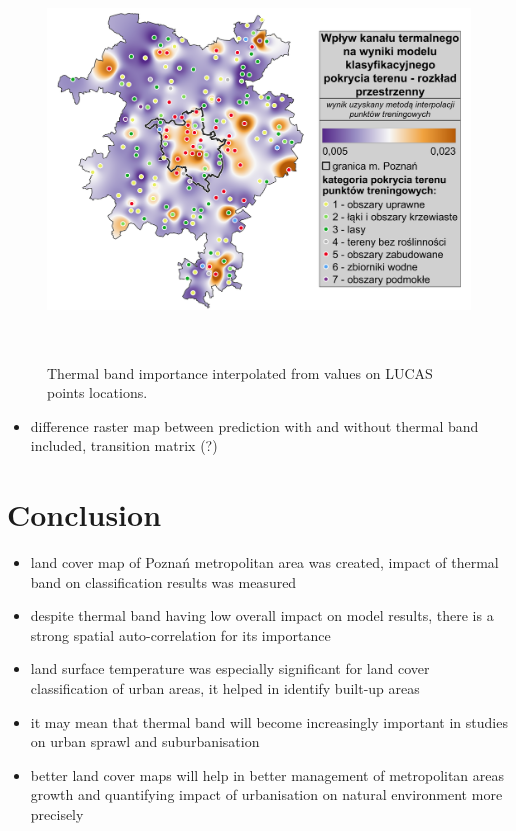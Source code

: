 \documentclass{amuthesis}
\begin{document}
\begin{figure}[t]

{\centering \includegraphics[width=5.875in,height=4.16667in]{./figures/B10_importance-spatial.png}

}

\caption{\label{fig-rycina18}Thermal band importance interpolated from
values on LUCAS points locations.}

\end{figure}

\begin{itemize}
\tightlist
\item
  difference raster map between prediction with and without thermal band
  included, transition matrix (?)
\end{itemize}


\hypertarget{conclusion}{%
\chapter{Conclusion}\label{conclusion}}

\begin{itemize}
\item
  land cover map of Poznań metropolitan area was created, impact of
  thermal band on classification results was measured
\item
  despite thermal band having low overall impact on model results, there
  is a strong spatial auto-correlation for its importance
\item
  land surface temperature was especially significant for land cover
  classification of urban areas, it helped in identify built-up areas
\item
  it may mean that thermal band will become increasingly important in
  studies on urban sprawl and suburbanisation
\item
  better land cover maps will help in better management of metropolitan
  areas growth and quantifying impact of urbanisation on natural
  environment more precisely
\end{itemize}
\end{document}
